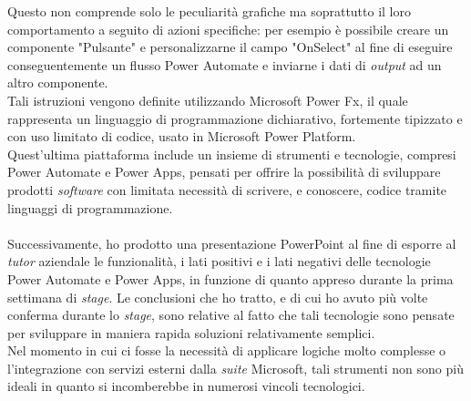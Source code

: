 Questo non comprende solo le peculiarità grafiche ma soprattutto il loro comportamento a seguito di azioni specifiche: per esempio è possibile creare un componente "Pulsante" e personalizzarne il campo "OnSelect" al fine di eseguire conseguentemente un flusso Power Automate e inviarne i dati di \emph{output} ad un altro componente.\\
Tali istruzioni vengono definite utilizzando Microsoft Power Fx, il quale rappresenta un linguaggio di programmazione dichiarativo, fortemente tipizzato e con uso limitato di codice, usato in Microsoft Power Platform.\\
Quest'ultima piattaforma include un insieme di strumenti e tecnologie, compresi Power Automate e Power Apps, pensati per offrire la possibilità di sviluppare prodotti \emph{software} con limitata necessità di scrivere, e conoscere, codice tramite linguaggi di programmazione.\\\\
Successivamente, ho prodotto una presentazione PowerPoint al fine di esporre al \emph{\emph{tutor}} aziendale le funzionalità, i lati positivi e i lati negativi delle tecnologie Power Automate e Power Apps, in funzione di quanto appreso durante la prima settimana di \emph{stage}.
Le conclusioni che ho tratto, e di cui ho avuto più volte conferma durante lo \emph{stage}, sono relative al fatto che tali tecnologie sono pensate per sviluppare in maniera rapida soluzioni relativamente semplici.\\
Nel momento in cui ci fosse la necessità di applicare logiche molto complesse o l'integrazione con servizi esterni dalla \emph{suite} Microsoft, tali strumenti non sono più ideali in quanto si incomberebbe in numerosi vincoli tecnologici.\\


